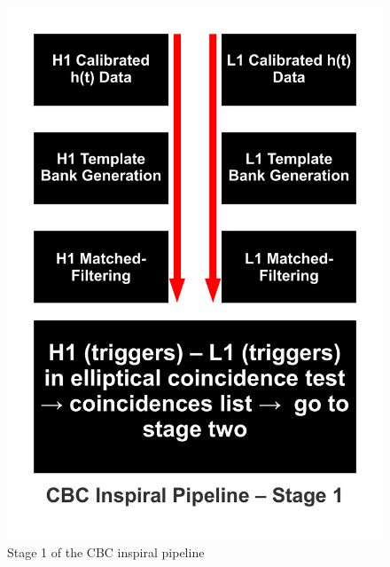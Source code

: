 \begin{figure}[htb!]
\centering
\includegraphics[scale=0.4]{Images/CBC_Stage_1.pdf}
\caption{Stage 1 of the CBC inspiral pipeline}
\label{cbcstage1}
\end{figure}
